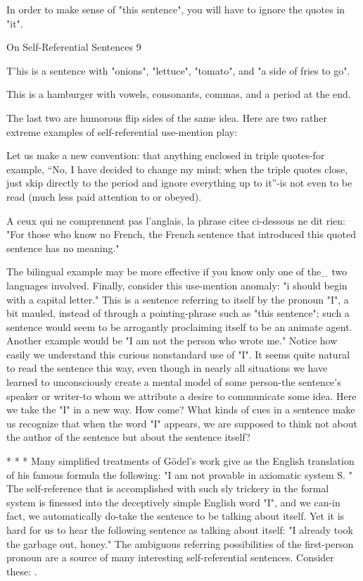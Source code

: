    In order to make sense of "this sentence", you will have to ignore the quotes in "it".




On Self-Referential Sentences                                                               9

   T'his is a sentence with "onions", "lettuce", "tomato", and "a side of fries to go".

   This is a hamburger with vowels, consonants, commas, and a period at the end.

The last two are humorous flip sides of the same idea. Here are two rather extreme
examples of self-referential use-mention play:

   Let us make a new convention: that anything enclosed in triple quotes-for example,
   "`No, I have decided to change my mind; when the triple quotes close, just skip
   directly to the period and ignore everything up to it"'-is not even to be read (much
   less paid attention to or obeyed).


   A ceux qui ne comprennent pas l'anglais, la phrase citee ci-dessous ne dit rien: "For
   those who know no French, the French sentence that introduced this quoted
   sentence has no meaning."

The bilingual example may be more effective if you know only one of the\_ two
languages involved.
        Finally, consider this use-mention anomaly: "i should begin with a capital letter."
This is a sentence referring to itself by the pronoun "I", a bit mauled, instead of through a
pointing-phrase such as "this sentence"; such a sentence would seem to be arrogantly
proclaiming itself to be an animate agent. Another example would be "I am not the
person who wrote me." Notice how easily we understand this curious nonstandard use of
"I". It seems quite natural to read the sentence this way, even though in nearly all
situations we have learned to unconsciously create a mental model of some person-the
sentence's speaker or writer-to whom we attribute a desire to communicate some idea.
Here we take the "I" in a new way. How come? What kinds of cues in a sentence make us
recognize that when the word "I" appears, we are supposed to think not about the author
of the sentence but about the sentence itself?

                                      *       *       *
Many simplified treatments of Gödel’s work give as the English translation of his famous
formula the following: "I am not provable in axiomatic system S. " The self-reference
that is accomplished with such sly trickery in the formal system is finessed into the
deceptively simple English word "I", and we can-in fact, we automatically do-take the
sentence to be talking about itself. Yet it is hard for us to hear the following sentence as
talking about itself: "I already took the garbage out, honey."
The ambiguous referring possibilities of the first-person pronoun are a source of many
interesting self-referential sentences. Consider these: .




